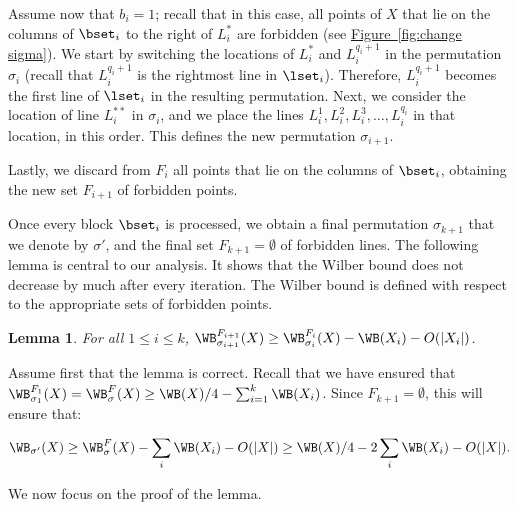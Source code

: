 \documentclass[11pt]{article}
\numberwithin{equation}{section}
\newtheorem{lemma}[theorem]{Lemma}
\theoremstyle{definition}
\theoremstyle{plain}
\newcommand{\expref}[2]{\hyperref[#2]{#1~\ref{#2}}}
\begin{document}
Assume now that $b_i=1$;  recall that in this case, all points of $X$ that lie on the columns of $\bset_i$ to the right of $L^*_i$ are forbidden  (see \expref{Figure}{fig:change sigma}). We start by switching the locations of $L^*_i$ and $L_i^{q_i+1}$ in the permutation $\sigma_i$ (recall that $L_i^{q_i+1}$ is the rightmost line in $\lset_i$). Therefore, $L_i^{q_i+1}$ becomes the first line of $\lset_i$ in the resulting permutation. Next, we
consider the location of line $L^{**}_i$ in $\sigma_i$, and we place the lines $L_i^1,L_i^2,L_i^3,\ldots,L_i^{q_i}$ in that location, in this order. This defines the new permutation $\sigma_{i+1}$.

Lastly, we discard from $F_i$ all points that lie on the columns of $\bset_i$, obtaining the new set $F_{i+1}$ of forbidden points.

Once every block $\bset_i$ is processed, we obtain a final permutation $\sigma_{k+1}$ that we denote by $\sigma'$, and the final set $F_{k+1}=\emptyset$ of forbidden lines. The following lemma is central to our analysis. It shows that the Wilber bound does not decrease by much after every iteration. The Wilber bound is defined with respect to the appropriate sets of forbidden points.


\begin{lemma}\label{lemma: small change}
	For all $1\leq i\leq k$,  $\WB^{F_{i+1}}_{\sigma_{i+1}}(X)\geq \WB^{F_i}_{\sigma_i}(X)-\WB(X_i)-O(|X_i|)$.
\end{lemma}

Assume first that the lemma is correct. Recall that we have ensured that $\WB^{F_1}_{\sigma_1}(X)=\WB^F_{\sigma}(X)\geq \WB(X)/4-\sum_{i=1}^k\WB(X_i)$. Since $F_{k+1}=\emptyset$, this will ensure that:

\[\WB_{\sigma'}(X)\geq \WB^F_{\sigma}(X)-\sum_i\WB(X_i)-O(|X|)\geq \WB(X)/4-2\sum_i \WB(X_i)-O(|X|).\]

We now focus on the proof of the lemma.
\end{document}
